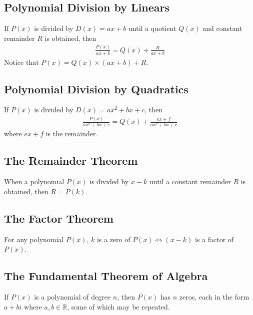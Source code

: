 \documentclass[10pt, a4paper, titlepage]{article}
\begin{document}
\begin{multicols*}{3}
	\dotfill
	\subsection{Polynomial Division by Linears}
	If $P(x)$ is divided by $D(x)=ax+b$ until a quotient $Q(x)$ and constant remainder $R$ is obtained, then
	\begin{align}
		\frac{P(x)}{ax+b}=Q(x)+\frac{R}{ax+b}
	\end{align}
	Notice that $P(x)=Q(x)\times (ax+b)+R$.
	
	\dotfill
	\subsection{Polynomial Division by Quadratics}
	If $P(x)$ is divided by $D(x)=ax^2+bx+c$, then
	\begin{align}
		\frac{P(x)}{ax^2+bx+c}=Q(x)+\frac{ex+f}{ax^2+bx+c}
	\end{align}
	where $ex+f$ is the remainder.
	
	\dotfill
	\subsection{The Remainder Theorem}
	When a polynomial $P(x)$ is divided by $x-k$ until a constant remainder $R$ is obtained, then $R=P(k)$.
	
	\dotfill
	\subsection{The Factor Theorem}
	For any polynomial $P(x)$, $k$ is a zero of $P(x)\iff (x-k)$ is a factor of $P(x)$.
	
	\dotfill
	\subsection{The Fundamental Theorem of Algebra}
	If $P(x)$ is a polynomial of degree $n$, then $P(x)$ has $n$ zeros, each in the form $a+bi$ where $a,b\in \mathbb{R}$, some of which may be repeated.
	

	\hrulefill


\end{multicols*}
\end{document}

